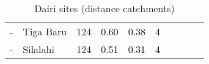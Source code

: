 \begin{table}[ht]
\begin{tabular}{C{0.05\textwidth}C{0.15\textwidth}C{0.08\textwidth}C{0.08\textwidth}C{0.08\textwidth}C{0.08\textwidth}C{0.08\textwidth}C{0.08\textwidth}C{0.08\textwidth}C{0.08\textwidth}}
  {-} & Tiga Baru & 124 & \textcolor[HTML]{000000}{0.60} & \textcolor[HTML]{000000}{0.38} & \textcolor[HTML]{000000}{4} &  &  &  &  \\ 
  {-} & Silalahi & 124 & \textcolor[HTML]{000000}{0.51} & \textcolor[HTML]{000000}{0.31} & \textcolor[HTML]{000000}{4} &  &  &  &  \\ 
  \end{tabular}
\endgroup
\caption{Dairi sites (distance catchments)} 
\end{table}

